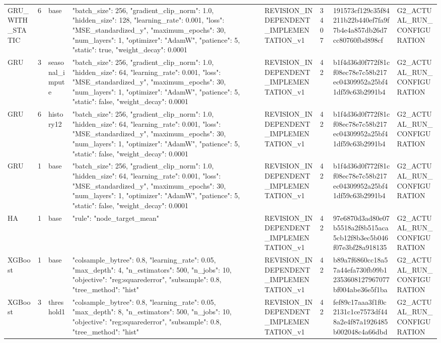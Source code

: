\begin{longtable}{llllllll}
GRU\_WITH\_STATIC & 6 & base & {"batch\_size": 256, "gradient\_clip\_norm": 1.0, "hidden\_size": 128, "learning\_rate": 0.001, "loss": "MSE\_standardized\_y", "maximum\_epochs": 30, "num\_layers": 1, "optimizer": "AdamW", "patience": 5, "static": true, "weight\_decay": 0.0001} & REVISION\_INDEPENDENT\_IMPLEMENTATION\_v1 & 3407 & 191573cf129c35f84211b22b440ef7fa9f7b4e4a857db26d7cc80760fbd898cf & G2\_ACTUAL\_RUN\_CONFIGURATION \\
GRU & 3 & seasonal\_impute & {"batch\_size": 256, "gradient\_clip\_norm": 1.0, "hidden\_size": 64, "learning\_rate": 0.001, "loss": "MSE\_standardized\_y", "maximum\_epochs": 30, "num\_layers": 1, "optimizer": "AdamW", "patience": 5, "static": false, "weight\_decay": 0.0001} & REVISION\_INDEPENDENT\_IMPLEMENTATION\_v1 & 42 & b1f4d36d0f772f81cf08ec78e7c58b217ec04309952a25bf41df59c63b2991b4 & G2\_ACTUAL\_RUN\_CONFIGURATION \\
GRU & 6 & history12 & {"batch\_size": 256, "gradient\_clip\_norm": 1.0, "hidden\_size": 64, "learning\_rate": 0.001, "loss": "MSE\_standardized\_y", "maximum\_epochs": 30, "num\_layers": 1, "optimizer": "AdamW", "patience": 5, "static": false, "weight\_decay": 0.0001} & REVISION\_INDEPENDENT\_IMPLEMENTATION\_v1 & 42 & b1f4d36d0f772f81cf08ec78e7c58b217ec04309952a25bf41df59c63b2991b4 & G2\_ACTUAL\_RUN\_CONFIGURATION \\
GRU & 1 & base & {"batch\_size": 256, "gradient\_clip\_norm": 1.0, "hidden\_size": 64, "learning\_rate": 0.001, "loss": "MSE\_standardized\_y", "maximum\_epochs": 30, "num\_layers": 1, "optimizer": "AdamW", "patience": 5, "static": false, "weight\_decay": 0.0001} & REVISION\_INDEPENDENT\_IMPLEMENTATION\_v1 & 42 & b1f4d36d0f772f81cf08ec78e7c58b217ec04309952a25bf41df59c63b2991b4 & G2\_ACTUAL\_RUN\_CONFIGURATION \\
HA & 1 & base & {"rule": "node\_target\_mean"} & REVISION\_INDEPENDENT\_IMPLEMENTATION\_v1 & 42 & 97e6870d3ad80e07b5518a2f8b515aca5cb12f8b3ec5b046f07e3bf28a918135 & G2\_ACTUAL\_RUN\_CONFIGURATION \\
XGBoost & 1 & base & {"colsample\_bytree": 0.8, "learning\_rate": 0.05, "max\_depth": 4, "n\_estimators": 500, "n\_jobs": 10, "objective": "reg:squarederror", "subsample": 0.8, "tree\_method": "hist"} & REVISION\_INDEPENDENT\_IMPLEMENTATION\_v1 & 42 & b89a7f6860cc18a57a44efa730fb99b12353608127967077bf004abe36e5f1ba & G2\_ACTUAL\_RUN\_CONFIGURATION \\
XGBoost & 3 & threshold1 & {"colsample\_bytree": 0.8, "learning\_rate": 0.05, "max\_depth": 8, "n\_estimators": 500, "n\_jobs": 10, "objective": "reg:squarederror", "subsample": 0.8, "tree\_method": "hist"} & REVISION\_INDEPENDENT\_IMPLEMENTATION\_v1 & 42 & fef89c17aaa3f1f0c2131c1ce7573df448a2e4f87a1926485b002048c4a66dbd & G2\_ACTUAL\_RUN\_CONFIGURATION \\

\end{longtable}
